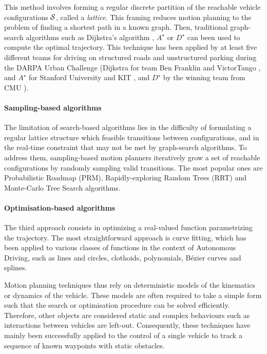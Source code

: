 This method involves forming a regular discrete partition of the reachable vehicle configurations $\mathcal{S}$, called a \emph{lattice}. This framing reduces motion planning to the problem of finding a shortest path in a known graph. Then, traditional graph-search algorithms such as Dijkstra's algorithm \citep{Dijkstra1959}, $A^\star$ \citep{Hart1968} or $D^\star$ \citep{Stentz1994} can been used to compute the optimal trajectory. This technique has been applied by at least five different teams for driving on structured roads and unstructured parking during the DARPA Urban Challenge (Dijkstra for team Ben Franklin \citep{Bohren2008} and VictorTango \citep{Bacha2008}, and $A^\star$ for Stanford University \citep{Montemerlo2008} and KIT \citep{Kammel2008}, and $D^\star$ by the winning team from CMU \citep{Urmson2008}).

\paragraph{Sampling-based algorithms}

The limitation of search-based algorithms lies in the difficulty of formulating a regular lattice structure which feasible transitions between configurations, and in the real-time constraint that may not be met by graph-search algorithms. To address them, sampling-based motion planners iteratively grow a set of reachable configurations by randomly sampling valid transitions. The most popular ones are Probabilistic Roadmap (PRM), Rapidly-exploring Random Trees (RRT) and Monte-Carlo Tree Search algorithms.

\paragraph{Optimisation-based algorithms}

The third approach consists in optimizing a real-valued function parametrizing the trajectory. The most straightforward approach is curve fitting, which has been applied to various classes of functions in the context of Autonomous Driving, such as lines and circles, clothoids, polynomials, Bézier curves and splines.

Motion planning techniques thus rely on deterministic models of the kinematics or dynamics of the vehicle. These models are often required to take a simple form such that the search or optimisation procedure can be solved efficiently. Therefore, other objects are considered static and complex behaviours such as interactions between vehicles are left-out. Consequently, these techniques have mainly been successfully applied to the control of a single vehicle to track a sequence of known waypoints with static obstacles.


